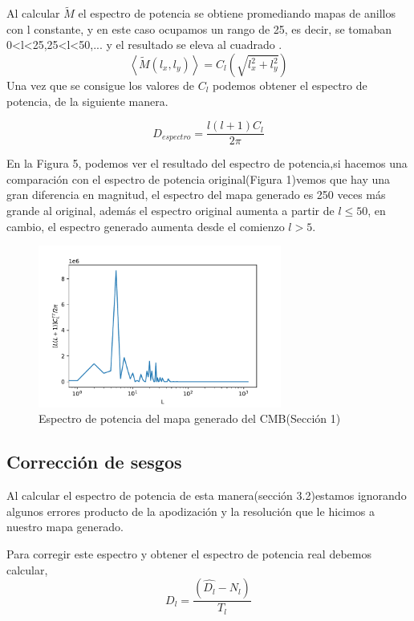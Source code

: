 \documentclass[a4paper]{article}
\begin{document}
Al calcular $\tilde{M}$ el espectro de potencia se obtiene promediando mapas de anillos con l constante, y en este caso ocupamos un rango de 25, es decir, se tomaban 0<l<25,25<l<50,... y el resultado se eleva al cuadrado .
\begin{equation}
    \left \langle \tilde{M}(l_x,l_y) \right \rangle =C_l\left ( \sqrt{l_x^2+l_y^2} \right )
\end{equation}
 Una vez que se consigue los valores de $C_l$ podemos obtener el espectro de potencia, de la siguiente manera.
 
\begin{equation}
    D_{espectro}=\frac{l(l+1)C_l}{2\pi}
\end{equation}
 
 En la Figura 5, podemos ver el resultado del espectro de potencia,si hacemos una comparación con el espectro de potencia original(Figura 1)vemos que hay una gran diferencia en magnitud, el espectro del mapa generado es 250 veces más grande al original, además  el espectro original aumenta a partir de $l\leq50$, en cambio, el espectro generado aumenta desde el comienzo $l>5$.
 
\begin{figure}
    \centering
    \includegraphics[width=8cm]{espectrodepotencia.pdf}
    \caption{Espectro de potencia del mapa generado del CMB(Sección 1)}
    \label{fig:my_label}
\end{figure}

\subsection{Corrección de sesgos}

Al calcular el espectro de potencia de esta manera(sección 3.2)estamos ignorando algunos errores producto de la apodización y la resolución que le hicimos a nuestro mapa generado.

Para corregir este espectro  y obtener el  espectro de potencia real debemos calcular,
\begin{equation}
    D_l=\frac{(\hat{D_l}-N_l)}{T_l}
\end{equation}
\end{document}
